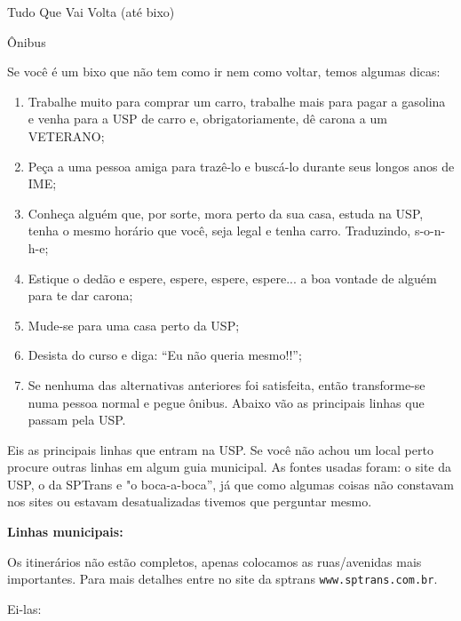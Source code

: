 \begin{secao}{Tudo Que Vai Volta (até bixo)}
\begin{subsecao}{Ônibus}

Se você é um bixo que não tem como ir nem como voltar, temos algumas dicas:

\begin{enumerate}
  \item Trabalhe muito para comprar um carro,
  trabalhe mais para pagar a gasolina e
  venha para a USP de carro e, obrigatoriamente, dê carona a um VETERANO;

  \item Peça a uma pessoa amiga para trazê-lo e buscá-lo durante seus
  longos anos de IME;

  \item Conheça alguém que, por sorte, mora perto da sua casa, estuda na USP,
  tenha o mesmo horário que você, seja legal e tenha carro. Traduzindo, s-o-n-h-e;

  \item Estique o dedão e espere, espere, espere, espere... a boa vontade
  de alguém para te dar carona;

  \item Mude-se para uma casa perto da USP;

  \item Desista do curso e diga: ``Eu não queria mesmo!!'';

  \item Se nenhuma das alternativas anteriores foi satisfeita, então
  transforme-se numa pessoa normal e pegue ônibus. Abaixo vão as
  principais linhas que passam pela USP.
\end{enumerate}

Eis as principais linhas que entram na USP. Se você não achou um local perto procure outras linhas em algum guia municipal. As fontes usadas foram: o site da USP, o da SPTrans e "o boca-a-boca”, já que como algumas coisas não constavam nos sites ou estavam desatualizadas tivemos que perguntar mesmo. 

{\bf Linhas municipais:}

Os itinerários não estão completos, apenas colocamos as ruas/avenidas mais
importantes. Para mais detalhes entre no site da sptrans 
{\tt www.sptrans.com.br}.

Ei-las:

\begin{itemize}


\end{itemize}
\end{subsecao}
\end{secao}
